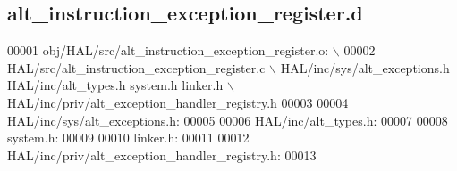 \subsection{alt\+\_\+instruction\+\_\+exception\+\_\+register.\+d}
\label{alt__instruction__exception__register_8d_source}

\begin{DoxyCode}
00001 obj/HAL/src/alt_instruction_exception_register.o: \(\backslash\)
00002  HAL/src/alt_instruction_exception_register.c \(\backslash\)
 HAL/inc/sys/alt\_exceptions.h HAL/inc/alt\_types.h system.h linker.h \(\backslash\)
 HAL/inc/priv/alt\_exception\_handler\_registry.h
00003 
00004 HAL/inc/sys/alt\_exceptions.h:
00005 
00006 HAL/inc/alt\_types.h:
00007 
00008 system.h:
00009 
00010 linker.h:
00011 
00012 HAL/inc/priv/alt\_exception\_handler\_registry.h:
00013 \end{DoxyCode}
